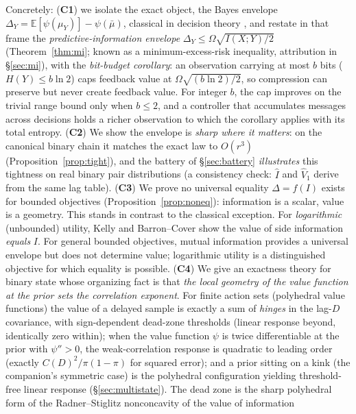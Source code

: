 \documentclass[acmsmall,screen,review,anonymous]{acmart}
\newcommand{\E}{\mathbb{E}}
\begin{document}
Concretely: (\textbf{C1}) we isolate the exact object, the Bayes envelope
$\Delta_Y=\E[\psi(\mu_Y)]-\psi(\bar\mu)$, classical in decision theory
\cite{howard1966,raiffa61,delaragossner}, and restate in that frame the
\emph{predictive-information envelope}
$\Delta_Y\le\Omega\sqrt{I(X;Y)/2}$ (Theorem~\ref{thm:mi}; known as a
minimum-excess-risk inequality, attribution in \S\ref{sec:mi}), with the
\emph{bit-budget corollary}: an observation carrying at most $b$ bits
($H(Y)\le b\ln 2$) caps feedback value at $\Omega\sqrt{(b\ln2)/2}$, so
compression can preserve but never create feedback value. For integer $b$, the cap
improves on the trivial range bound only when $b\le2$, and a controller that accumulates messages across decisions
holds a richer observation to which the corollary applies with its total
entropy. (\textbf{C2}) We show the envelope is \emph{sharp
where it matters}: on the canonical binary chain it matches the exact law to
$O(r^3)$ (Proposition~\ref{prop:tight}), and the battery of
\S\ref{sec:battery} \emph{illustrates} this tightness on real binary
pair distributions (a
consistency check: $\hat I$ and $\widehat V_1$ derive
from the same lag table). (\textbf{C3}) We prove no universal
equality $\Delta=f(I)$ exists for bounded objectives
(Proposition~\ref{prop:noneq}): information is a scalar, value is a
geometry. This stands in contrast to the classical exception. For
\emph{logarithmic} (unbounded) utility, Kelly and Barron--Cover
\cite{kelly56,barroncover88} show the value of side information \emph{equals}
$I$. For general bounded objectives, mutual information provides a
universal envelope but does not determine value; logarithmic utility is a
distinguished objective for which equality is possible.
(\textbf{C4}) We give an exactness theory for binary state whose organizing
fact is that \emph{the local geometry of the value function at the prior
sets the correlation exponent}. For finite action sets (polyhedral value
functions) the value of a delayed sample is exactly a sum of
\emph{hinges} in the lag-$D$ covariance, with sign-dependent dead-zone
thresholds (linear response beyond, identically zero within); when the
value function $\psi$ is twice differentiable at the prior with
$\psi''>0$, the weak-correlation response is quadratic to leading order
(exactly $C(D)^2/\pi(1-\pi)$ for squared error); and a prior sitting on
a kink (the companion's symmetric case) is the polyhedral
configuration yielding threshold-free linear response
(\S\ref{sec:multistate}). The dead zone is the sharp polyhedral form of the
Radner--Stiglitz nonconcavity of the value of information
\end{document}
